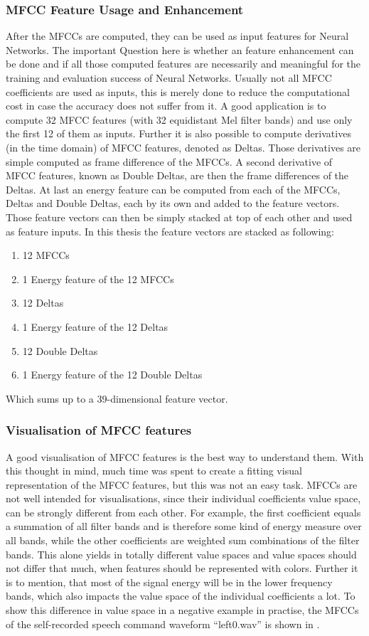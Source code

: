 \subsubsection{MFCC Feature Usage and Enhancement}
After the MFCCs are computed, they can be used as input features for Neural Networks. 
The important Question here is whether an feature enhancement can be done and if all those computed features are necessarily and meaningful for the training and evaluation success of Neural Networks. Usually not all MFCC coefficients are used as inputs, this is merely done to reduce the computational cost in case the accuracy does not suffer from it.
A good application is to compute 32 MFCC features (with 32 equidistant Mel filter bands) and use only the first 12 of them as inputs.
Further it is also possible to compute derivatives (in the time domain) of MFCC features, denoted as Deltas. 
Those derivatives are simple computed as frame difference of the MFCCs.
A second derivative of MFCC features, known as Double Deltas, are then the frame differences of the Deltas.
At last an energy feature can be computed from each of the MFCCs, Deltas and Double Deltas, each by its own and added to the feature vectors.
Those feature vectors can then be simply stacked at top of each other and used as feature inputs.
In this thesis the feature vectors are stacked as following:
\begin{enumerate}
    \item 12 MFCCs
    \item 1 Energy feature of the 12 MFCCs
    \item 12 Deltas
    \item 1 Energy feature of the 12 Deltas
    \item 12 Double Deltas
    \item 1 Energy feature of the 12 Double Deltas
\end{enumerate}
Which sums up to a 39-dimensional feature vector.

\subsubsection{Visualisation of MFCC features}
A good visualisation of MFCC features is the best way to understand them.
With this thought in mind, much time was spent to create a fitting visual representation of the MFCC features, but this was not an easy task.
MFCCs are not well intended for visualisations, since their individual coefficients value space, can be strongly different from each other.
For example, the first coefficient equals a summation of all filter bands and is therefore some kind of energy measure over all bands, while the other coefficients are weighted sum combinations of the filter bands.
This alone yields in totally different value spaces and value spaces should not differ that much, when features should be represented with colors.
Further it is to mention, that most of the signal energy will be in the lower frequency bands, which also impacts the value space of the individual coefficients a lot.
To show this difference in value space in a negative example in practise, the MFCCs of the self-recorded speech command waveform \enquote{left0.wav} is shown in .

